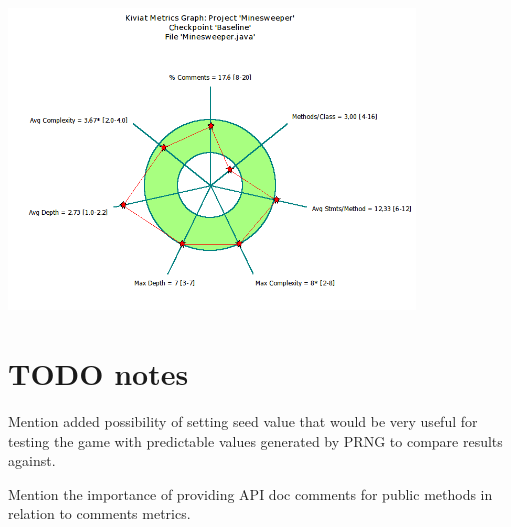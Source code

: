 \documentclass[UKenglish]{article}  %
\begin{document}
\includegraphics[height=8cm]{Minesweeper_java-kiviat-metrics-graph-original.png}

\section{TODO notes}
Mention added possibility of setting seed value that would be very useful for
testing the game with predictable values generated by PRNG to compare results
against.


Mention the importance of providing API doc comments for public methods in
relation to comments metrics.
\end{document}

